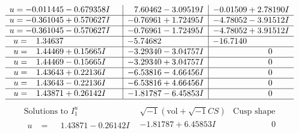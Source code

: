\documentclass[1p]{elsarticle_modified}
\theoremstyle{definition}
\newcommand{\I}{\sqrt{-1}}
\begin{document}
$$\begin{array}{c|c|c}
\begin{aligned}
u &= -0.011445 - 0.679358 I\end{aligned}
 & \phantom{-}7.60462 - 3.09519 I & -0.01509 + 2.78190 I \\ \hline\begin{aligned}
u &= -0.361045 + 0.570627 I\end{aligned}
 & -0.76961 + 1.72495 I & -4.78052 - 3.91512 I \\ \hline\begin{aligned}
u &= -0.361045 - 0.570627 I\end{aligned}
 & -0.76961 - 1.72495 I & -4.78052 + 3.91512 I \\ \hline\begin{aligned}
u &= \phantom{-}1.34637\phantom{ +0.000000I}\end{aligned}
 & -5.74682\phantom{ +0.000000I} & -16.7140\phantom{ +0.000000I} \\ \hline\begin{aligned}
u &= \phantom{-}1.44469 + 0.15665 I\end{aligned}
 & -3.29340 - 3.04757 I & \phantom{-0.000000 } 0 \\ \hline\begin{aligned}
u &= \phantom{-}1.44469 - 0.15665 I\end{aligned}
 & -3.29340 + 3.04757 I & \phantom{-0.000000 } 0 \\ \hline\begin{aligned}
u &= \phantom{-}1.43643 + 0.22136 I\end{aligned}
 & -6.53816 - 4.66456 I & \phantom{-0.000000 } 0 \\ \hline\begin{aligned}
u &= \phantom{-}1.43643 - 0.22136 I\end{aligned}
 & -6.53816 + 4.66456 I & \phantom{-0.000000 } 0 \\ \hline\begin{aligned}
u &= \phantom{-}1.43871 + 0.26142 I\end{aligned}
 & -1.81787 - 6.45853 I & \phantom{-0.000000 } 0\\
 \hline 
 \end{array}$$\newpage$$\begin{array}{c|c|c}  
\text{Solutions to }I^u_{1}& \I (\text{vol} + \sqrt{-1}CS) & \text{Cusp shape}\\
 \hline 
\begin{aligned}
u &= \phantom{-}1.43871 - 0.26142 I\end{aligned}
 & -1.81787 + 6.45853 I & \phantom{-0.000000 } 0 \\ \hline\begin{aligned}

\end{aligned}
\end{array}$$
\end{document}

